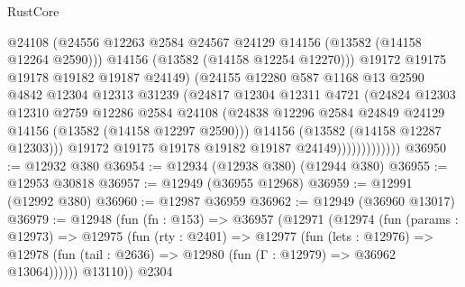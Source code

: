 \begin{lexlean}{RustCore}
\begin{coremodule}
                              @24108
                              (@24556
                                @12263
                                @2584
                                @24567
                                @24129
                                @14156
                                (@13582 (@14158 @12264 @2590)))
                              @14156
                              (@13582 (@14158 @12254 @12270)))
                            @19172
                            @19175
                            @19178
                            @19182
                            @19187
                            @24149)
                          (@24155
                            @12280
                            @587
                            @1168
                            @13
                            @2590
                            @4842
                            @12304
                            @12313
                            @31239
                            (@24817
                              @12304
                              @12311
                              @4721
                              (@24824
                                @12303
                                @12310
                                @2759
                                @12286
                                @2584
                                @24108
                                (@24838
                                  @12296
                                  @2584
                                  @24849
                                  @24129
                                  @14156
                                  (@13582 (@14158 @12297 @2590)))
                                @14156
                                (@13582 (@14158 @12287 @12303)))
                              @19172
                              @19175
                              @19178
                              @19182
                              @19187
                              @24149)))))))))))))
@36950 := @12932 @380
@36954 := @12934 (@12938 @380) (@12944 @380)
@36955 := @12953 @30818
@36957 := @12949 (@36955 @12968)
@36959 := @12991 (@12992 @380)
@36960 := @12987 @36959
@36962 := @12949 (@36960 @13017)
@36979 := @12948
    (fun (fn : @153) =>
    @36957
      (@12971
        (@12974
          (fun (params : @12973) =>
          @12975
            (fun (rty : @2401) =>
            @12977
              (fun (lets : @12976) =>
              @12978 (fun (tail : @2636) => @12980 (fun (Γ : @12979) => @36962 @13064))))))
        @13110))
    @2304

\end{coremodule}
\end{lexlean}
